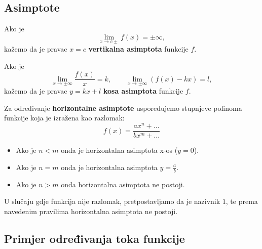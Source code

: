 \subsection{Asimptote}

Ako je
$$
\lim_{x\to c\pm}f(x)=\pm\infty,
$$
kažemo da je pravac $x=c$ \textbf{vertikalna asimptota} funkcije $f$.

Ako je
$$
\lim_{x\to\pm\infty}\frac{f(x)}{x}=k,\qquad \lim_{x\to\pm\infty}(f(x)-kx)=l,
$$
kažemo da je pravac $y=kx+l$ \textbf{kosa asimptota} funkcije $f$.

Za određivanje \textbf{horizontalne asimptote} uspoređujemo stupnjeve polinoma
funkcije koja je izražena kao razlomak:
$$
f(x)=\frac{ax^n+\dots}{bx^m+\dots}
$$
\begin{itemize}
    \item Ako je $n<m$ onda je horizontalna asimptota x-os ($y=0$).
    \item Ako je $n=m$ onda je horizontalna asimptota $\displaystyle y=\frac{a}{b}$.
    \item Ako je $n>m$ onda horizontalna asimptota ne postoji.
\end{itemize}

U slučaju gdje funkcija nije razlomak, pretpostavljamo da je nazivnik $1$, te
prema navedenim pravilima horizontalna asimptota ne postoji.

\subsection{Primjer određivanja toka funkcije}


